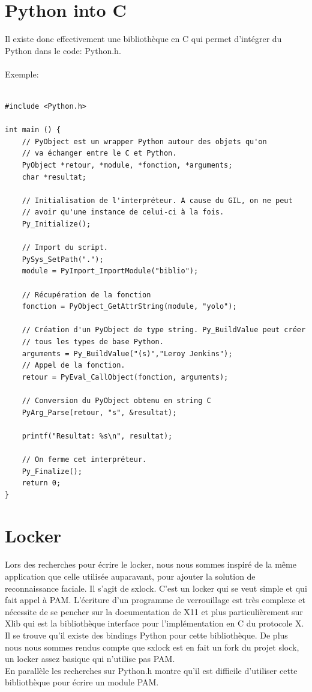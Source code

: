 \documentclass{article}
\begin{document}
  \section{Python into C}

  Il existe donc effectivement une bibliothèque en C qui permet d’intégrer du
  Python dans le code: Python.h.
\\ \\
  Exemple:

  \begin{verbatim}

#include <Python.h>

int main () {
    // PyObject est un wrapper Python autour des objets qu'on
    // va échanger entre le C et Python.
    PyObject *retour, *module, *fonction, *arguments;
    char *resultat;

    // Initialisation de l'interpréteur. A cause du GIL, on ne peut
    // avoir qu'une instance de celui-ci à la fois.
    Py_Initialize();

    // Import du script.
    PySys_SetPath(".");
    module = PyImport_ImportModule("biblio");

    // Récupération de la fonction
    fonction = PyObject_GetAttrString(module, "yolo");

    // Création d'un PyObject de type string. Py_BuildValue peut créer
    // tous les types de base Python.
    arguments = Py_BuildValue("(s)","Leroy Jenkins");
    // Appel de la fonction.
    retour = PyEval_CallObject(fonction, arguments);

    // Conversion du PyObject obtenu en string C
    PyArg_Parse(retour, "s", &resultat);

    printf("Resultat: %s\n", resultat);

    // On ferme cet interpréteur.
    Py_Finalize();
    return 0;
}
  \end{verbatim}

  \section{Locker}

  Lors des recherches pour écrire le locker, nous nous sommes inspiré de la même
  application que celle utilisée auparavant, pour ajouter la solution de
  reconnaissance faciale. Il s’agit de sxlock. C’est un locker qui se
  veut simple et qui fait appel à PAM. L’écriture d’un programme de
  verrouillage est très complexe et nécessite de se pencher sur la
  documentation de X11 et plus particulièrement sur Xlib qui est la
  bibliothèque interface pour l’implémentation en C du protocole X. Il se
  trouve qu’il existe des bindings Python pour cette bibliothèque. De plus nous
  nous sommes rendus compte que sxlock est en fait un fork du projet slock, un
  locker assez basique qui n’utilise pas PAM.
\\
  En parallèle les recherches sur Python.h montre qu’il est difficile
  d’utiliser cette bibliothèque pour écrire un module PAM.
\end{document}
